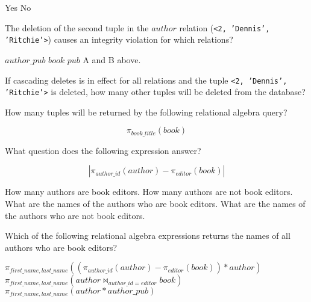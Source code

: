 \documentclass[answers,10pt,a4paper]{exam}
\begin{document}
\begin{questions}
\begin{choices}
\correctchoice Yes
\choice No
\end{choices}

\question[4] The deletion of the second tuple in the $author$ relation ({\tt <2, 'Dennis', 'Ritchie'>}) causes an integrity violation for which relations?

\begin{choices}
\choice $author\_pub$
\choice $book$
\choice $pub$
\correctchoice A and B above.
\end{choices}


\question[4] If cascading deletes is in effect for all relations and the tuple {\tt <2, 'Dennis', 'Ritchie'>} is deleted, how many other tuples will be deleted from the database?

\begin{choices}
\end{choices}

\question[4] How many tuples will be returned by the following relational algebra query?

\[
\pi_{book\_title}(book)
\]

\begin{choices}
\end{choices}

\newpage

\question[4] What question does the following expression answer?

\[
|\pi_{author\_id}(author)  -  \pi_{editor}(book)|
\]

\begin{choices}
\choice How many authors are book editors.
\correctchoice How many authors are not book editors.
\choice What are the names of the authors who are book editors.
\choice What are the names of the authors who are not book editors.
\end{choices}

\question[4] Which of the following relational algebra expressions returns the names of all authors who are book editors?

\begin{choices}
\choice $\pi_{first\_name, last\_name}((\pi_{author\_id}(author)  -  \pi_{editor}(book)) * author)$
\correctchoice $\pi_{first\_name, last\_name}(author \bowtie_{author\_id = editor} book)$
\choice $\pi_{first\_name, last\_name}(author * author\_pub)$
\end{choices}


\end{questions}
\end{document}

